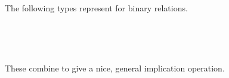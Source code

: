 The following types represent  for binary relations.
\ccpad
\begin{code}%
\>[0]\AgdaSpace{}%
\AgdaSymbol{:}\AgdaSpace{}%
\AgdaSymbol{(}\AgdaSpace{}%
\AgdaSpace{}%
\AgdaSpace{}%
\AgdaSpace{}%
\AgdaSymbol{)}\AgdaSpace{}%
\AgdaSpace{}%
\AgdaSymbol{(}\AgdaSpace{}%
\AgdaSpace{}%
\AgdaSymbol{)}\AgdaSpace{}%
\AgdaSpace{}%
\AgdaSymbol{(}\AgdaSpace{}%
\AgdaSpace{}%
\AgdaSpace{}%
\AgdaSpace{}%
\AgdaSymbol{)}\<%
\\
\>[0]\AgdaSpace{}%
\AgdaSpace{}%
\AgdaSpace{}%
\AgdaSymbol{=}\AgdaSpace{}%
\AgdaSpace{}%
\AgdaSpace{}%
\AgdaSpace{}%
\AgdaSpace{}%
\AgdaSpace{}%
\AgdaSymbol{(}\AgdaSpace{}%
\AgdaSymbol{)}\AgdaSpace{}%
\AgdaSymbol{(}\AgdaSpace{}%
\AgdaSymbol{)}\<%
\end{code}
\scpad
\begin{code}
\>[1]\AgdaSpace{}%
\AgdaSymbol{:}\AgdaSpace{}%
\AgdaSpace{}%
\AgdaSpace{}%
\AgdaSpace{}%
\AgdaSpace{}%
\AgdaSpace{}%
\AgdaSpace{}%
\AgdaSpace{}%
\AgdaSpace{}%
\AgdaSpace{}%
\AgdaSpace{}%
\AgdaSpace{}%
\AgdaSpace{}%
\AgdaSpace{}%
\AgdaSpace{}%
\AgdaSpace{}%
\AgdaSpace{}%
\AgdaSpace{}%
\<%
\\
%
\>[1]\AgdaSpace{}%
\AgdaSpace{}%
\AgdaSpace{}%
\AgdaSymbol{=}\AgdaSpace{}%
\AgdaSpace{}%
\AgdaSymbol{\{}\AgdaSpace{}%
\AgdaSymbol{\}}\AgdaSpace{}%
\AgdaSpace{}%
\AgdaSpace{}%
\AgdaSpace{}%
\AgdaSpace{}%
\AgdaSpace{}%
\AgdaSpace{}%
\AgdaSpace{}%
\<%
\end{code}
\ccpad
These combine to give a nice, general implication operation.
